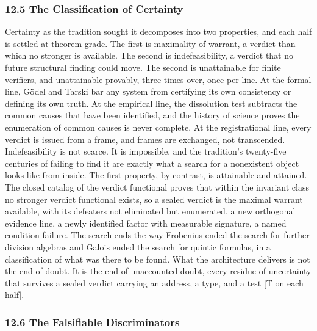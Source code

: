\documentclass[10pt,twocolumn]{article}
\begin{document}
\hypertarget{the-classification-of-certainty}{%
\subsubsection{12.5 The Classification of
Certainty}\label{the-classification-of-certainty}}

Certainty as the tradition sought it decomposes into two properties, and
each half is settled at theorem grade. The first is maximality of
warrant, a verdict than which no stronger is available. The second is
indefeasibility, a verdict that no future structural finding could move.
The second is unattainable for finite verifiers, and unattainable
provably, three times over, once per line. At the formal line, Gödel and
Tarski bar any system from certifying its own consistency or defining
its own truth. At the empirical line, the dissolution test subtracts the
common causes that have been identified, and the history of science
proves the enumeration of common causes is never complete. At the
registrational line, every verdict is issued from a frame, and frames
are exchanged, not transcended. Indefeasibility is not scarce. It is
impossible, and the tradition's twenty-five centuries of failing to find
it are exactly what a search for a nonexistent object looks like from
inside. The first property, by contrast, is attainable and attained. The
closed catalog of the verdict functional proves that within the
invariant class no stronger verdict functional exists, so a sealed
verdict is the maximal warrant available, with its defeaters not
eliminated but enumerated, a new orthogonal evidence line, a newly
identified factor with measurable signature, a named condition failure.
The search ends the way Frobenius ended the search for further division
algebras and Galois ended the search for quintic formulas, in a
classification of what was there to be found. What the architecture
delivers is not the end of doubt. It is the end of unaccounted doubt,
every residue of uncertainty that survives a sealed verdict carrying an
address, a type, and a test {[}T on each half{]}.

\hypertarget{the-falsifiable-discriminators}{%
\subsubsection{12.6 The Falsifiable
Discriminators}\label{the-falsifiable-discriminators}}
\end{document}
